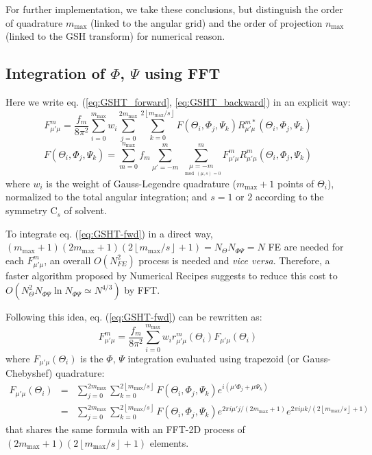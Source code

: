For further implementation, we take these conclusions, but distinguish
the order of quadrature $m_{\mathrm{max}}$ (linked to the angular
grid) and the order of projection $n_{\mathrm{max}}$ (linked to the
\acs{GSH} transform) for numerical reason.

\subsection{Integration of $\Phi$, $\Psi$ using FFT}

Here we write eq. (\ref{eq:GSHT_forward}, \ref{eq:GSHT_backward})
in an explicit way:
\begin{equation}
F_{\mu'\mu}^{m}=\frac{f_{m}}{8\pi^{2}}\sum_{i=0}^{m_{\mathrm{max}}}w_{i}\sum_{j=0}^{2m_{\mathrm{max}}}\sum_{k=0}^{2\left\lfloor m_{\mathrm{max}}/s\right\rfloor }F(\Theta_{i},\Phi_{j},\Psi_{k})R_{\mu'\mu}^{m*}(\Theta_{i},\Phi_{j},\Psi_{k})\label{eq:GSHT-fwd}
\end{equation}
\begin{equation}
F(\Theta_{i},\Phi_{j},\Psi_{k})=\sum_{m=0}^{n_{\mathrm{max}}}f_{m}\sum_{\mu'=-m}^{m}\sum_{\underset{\mod(\mu,s)=0}{\mu=-m}}^{m}F_{\mu'\mu}^{m}R_{\mu'\mu}^{m}(\Theta_{i},\Phi_{j},\Psi_{k})\label{eq:GSHT-bwd}
\end{equation}
where $w_{i}$ is the weight of Gauss-Legendre quadrature ($m_{\mathrm{max}}+1$
points of $\Theta_{i}$), normalized to the total angular integration;
and $s=1$ or $2$ according to the symmetry $\mathrm{C}_{s}$ of
solvent.

To integrate eq. (\ref{eq:GSHT-fwd}) in a direct way, $(m_{\mathrm{max}}+1)(2m_{\mathrm{max}}+1)(2\left\lfloor m_{\mathrm{max}}/s\right\rfloor +1)=N_{\Theta}N_{\Phi\Psi}=N$
\acs{FE} are needed for each $F_{\mu'\mu}^{m}$, an overall $O(N_{FE}^{2})$
process is needed and \textit{vice versa}. Therefore, a faster algorithm
proposed by Numerical Recipes \citep{Numerical_Recipes_3ed} suggests
to reduce this cost to $O(N_{\Theta}^{2}N_{\Phi\Psi}\ln N_{\Phi\Psi}\simeq N^{4/3})$
by \acs{FFT}.

Following this idea, eq. (\ref{eq:GSHT-fwd}) can be rewritten as:
\begin{equation}
F_{\mu'\mu}^{m}=\frac{f_{m}}{8\pi^{2}}\sum_{i=0}^{m_{\mathrm{max}}}w_{i}r_{\mu'\mu}^{m}(\Theta_{i})F_{\mu'\mu}(\Theta_{i})
\end{equation}
where $F_{\mu'\mu}(\Theta_{i})$ is the $\Phi$, $\Psi$ integration
evaluated using trapezoid (or Gauss-Chebyshef) quadrature:
\begin{eqnarray}
F_{\mu'\mu}(\Theta_{i}) & = & \sum_{j=0}^{2m_{\mathrm{max}}}\sum_{k=0}^{2\left\lfloor m_{\mathrm{max}}/s\right\rfloor }F(\Theta_{i},\Phi_{j},\Psi_{k})e^{i(\mu'\Phi_{j}+\mu\Psi_{k})}\label{eq:f_mup_mu}\\
 & = & \sum_{j=0}^{2m_{\mathrm{max}}}\sum_{k=0}^{2\left\lfloor m_{\mathrm{max}}/s\right\rfloor }F(\Theta_{i},\Phi_{j},\Psi_{k})e^{2\pi i\mu'j/(2m_{\mathrm{max}}+1)}e^{2\pi i\mu k/(2\left\lfloor m_{\mathrm{max}}/s\right\rfloor +1)}\nonumber 
\end{eqnarray}
that shares the same formula with an \acs{FFT}-2D process of $\left(2m_{\mathrm{max}}+1\right)\left(2\left\lfloor m_{\mathrm{max}}/s\right\rfloor +1\right)$
elements.

